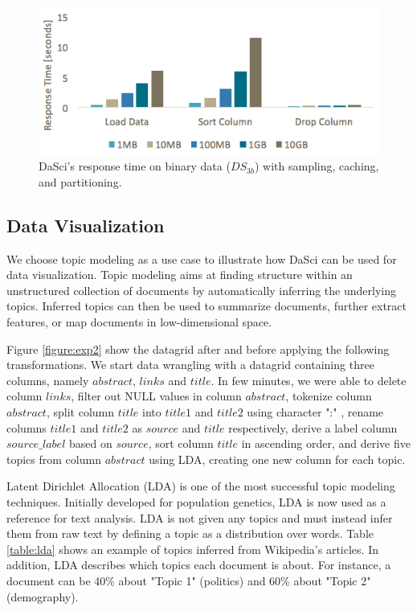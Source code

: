 \documentclass[10pt, a4paper, twocolumn]{article} %
\begin{document}
\begin{figure}
	\centering
	\includegraphics[scale=0.5]{images/exp1-all.png}
	\caption{DaSci's response time on binary data ($DS_{3b}$) with sampling, caching, and partitioning.}
	\label{figure:exp1-all}
\end{figure}


\subsection{Data Visualization}

We choose topic modeling as a use case to illustrate how DaSci can be used for data visualization.
Topic modeling aims at finding structure within an unstructured collection of documents by automatically inferring the underlying topics.
Inferred topics can then be used to summarize documents, further extract features, or map documents in low-dimensional space.

Figure \ref{figure:exp2} show the datagrid after and before applying the following transformations. We start data wrangling with a datagrid containing three columns, namely $abstract$, $links$ and $title$. In few minutes, we were able to
delete column $links$,
filter out NULL values in column $abstract$,
tokenize column $abstract$,
split column $title$ into $title1$ and $title2$ using character ":" ,
rename columns $title1$ and $title2$ as $source$ and $title$ respectively,
derive a label column $source\_label$ based on $source$, 
sort column $title$ in ascending order, and
derive five topics from column $abstract$ using LDA, creating one new column for each topic. 

Latent Dirichlet Allocation (LDA) is one of the most successful topic modeling techniques.
Initially developed for population genetics, LDA is now used as a reference for text analysis.
LDA is not given any topics and must instead infer them from raw text by defining a topic as a distribution over words.
Table \ref{table:lda} shows an example of topics inferred from Wikipedia's articles. In addition, LDA describes which topics each document is about. For instance, a document can be 40\% about "Topic 1" (politics) and 60\% about "Topic 2" (demography).
\end{document}
